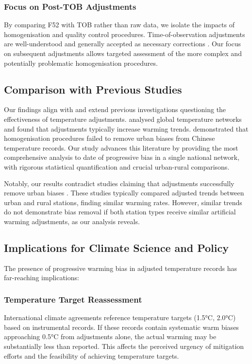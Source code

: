 \documentclass[11pt, a4paper]{article}
\begin{document}
\subsubsection{Focus on Post-TOB Adjustments}
By comparing F52 with TOB rather than raw data, we isolate the impacts of homogenisation and quality control procedures. Time-of-observation adjustments are well-understood and generally accepted as necessary corrections \parencite{vose2003tobs}. Our focus on subsequent adjustments allows targeted assessment of the more complex and potentially problematic homogenisation procedures.

\subsection{Comparison with Previous Studies}

Our findings align with and extend previous investigations questioning the effectiveness of temperature adjustments. \textcite{steirou2012investigation} analysed global temperature networks and found that adjustments typically increase warming trends. \textcite{connolly2021evaluation} demonstrated that homogenisation procedures failed to remove urban biases from Chinese temperature records. Our study advances this literature by providing the most comprehensive analysis to date of progressive bias in a single national network, with rigorous statistical quantification and crucial urban-rural comparisons.

Notably, our results contradict studies claiming that adjustments successfully remove urban biases \parencite{hausfather2013quantifying,hausfather2016evaluating}. These studies typically compared adjusted trends between urban and rural stations, finding similar warming rates. However, similar trends do not demonstrate bias removal if both station types receive similar artificial warming adjustments, as our analysis reveals.

\subsection{Implications for Climate Science and Policy}

The presence of progressive warming bias in adjusted temperature records has far-reaching implications:

\subsubsection{Temperature Target Reassessment}
International climate agreements reference temperature targets (1.5°C, 2.0°C) based on instrumental records. If these records contain systematic warm biases approaching 0.5°C from adjustments alone, the actual warming may be substantially less than reported. This affects the perceived urgency of mitigation efforts and the feasibility of achieving temperature targets.
\end{document}
